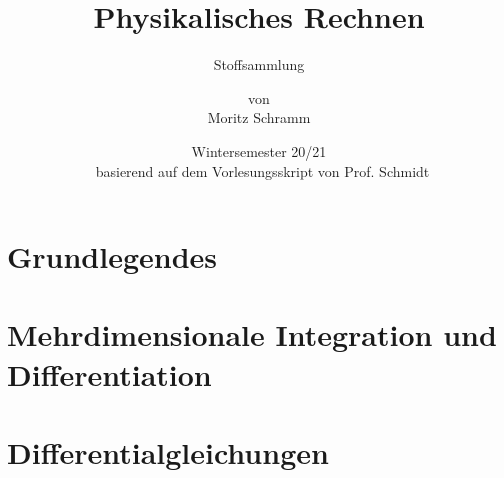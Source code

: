 \documentclass[a4paper, 12pt]{report}
\institute{Universität Bayreuth}
\title{Physikalisches Rechnen}
\subtitle{Stoffsammlung}
\author{von\\Moritz Schramm}%
\date{Wintersemester 20/21 \\ \small basierend auf dem Vorlesungsskript von Prof. Schmidt}
\begin{document}
    \maketitle
    \romantableofcontents

    \chapter{Grundlegendes}
    
    
    \chapter{Mehrdimensionale Integration und Differentiation}
    
    
	\chapter{Differentialgleichungen}
	
\end{document}
